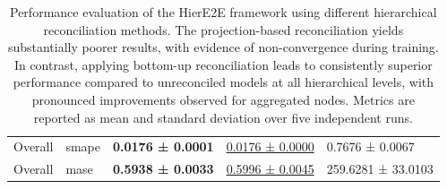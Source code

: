 \documentclass[letterpaper]{article}
\begin{document}
\begin{table}
{{\begin{tabular}{lllll}
Overall & smape & \textbf{0.0176 ± 0.0001} & \underline{0.0176 ± 0.0000} & 0.7676 ± 0.0067 \\
Overall & mase & \textbf{0.5938 ± 0.0033} & \underline{0.5996 ± 0.0045} & 259.6281 ± 33.0103 \\
\bottomrule
\end{tabular}
}}
\caption{
Performance evaluation of the HierE2E framework using different hierarchical reconciliation methods. The projection-based reconciliation yields substantially poorer results, with evidence of non-convergence during training. In contrast, applying bottom-up reconciliation leads to consistently superior performance compared to unreconciled models at all hierarchical levels, with pronounced improvements observed for aggregated nodes. Metrics are reported as mean and standard deviation over five independent runs.}
    \label{tab:recon}
\end{table}
\end{document}
